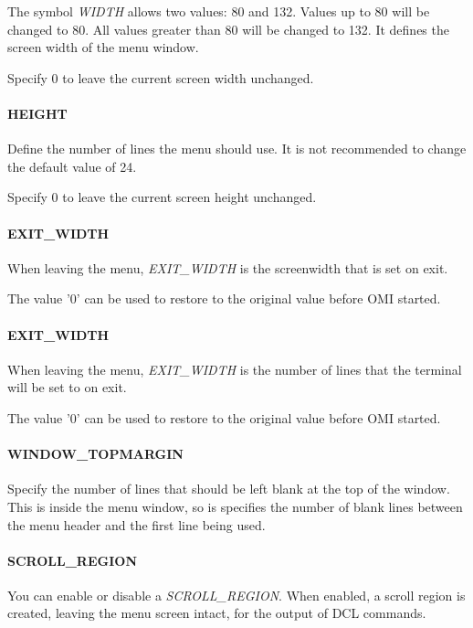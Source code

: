 \documentclass[a4paper]{book}
\begin{document}
The symbol \textsl{WIDTH} allows two values: 80 and 132. Values up to 80 will be 
changed to 80. All values greater than 80 will be changed to 132. It defines 
the screen width of the menu window.

Specify 0 to leave the current screen width unchanged.

\paragraph{HEIGHT}

Define the number of lines the menu should use. It is not recommended to 
change the default value of 24.

Specify 0 to leave the current screen height unchanged.

\paragraph{EXIT{\_}WIDTH}

When leaving the menu, \textsl{EXIT{\_}WIDTH} is the screenwidth that is set on 
exit.

The value '0' can be used to restore to the original value before OMI started.

\paragraph{EXIT{\_}WIDTH}

When leaving the menu, \textsl{EXIT{\_}WIDTH} is the number of lines that the terminal will be set to on exit.

The value '0' can be used to restore to the original value before OMI started.

\paragraph{WINDOW{\_}TOPMARGIN}

Specify the number of lines that should be left blank at the top of the 
window. This is inside the menu window, so is specifies the number of blank 
lines between the menu header and the first line being used.

\paragraph{SCROLL{\_}REGION}

You can enable or disable a \textsl{SCROLL{\_}REGION}. When enabled, a scroll region 
is created, leaving the menu screen intact, for the output of DCL commands.
\end{document}
